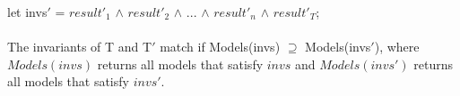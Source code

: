 \begin{definition}
\begin{enumerate}
let invs$'$ = $result'_1$ $\wedge$ $result'_2$ $\wedge$ ... $\wedge$ $result'_n$ $\wedge$ $result'_T$;\\
\\
The invariants of T and T$'$ match if Models(invs) $\supseteq$ Models(invs$'$), where $Models(invs)$ returns all models that satisfy $invs$ and $Models(invs')$ returns all models that satisfy $invs'$.\\



 

\end{enumerate}
\end{definition}
